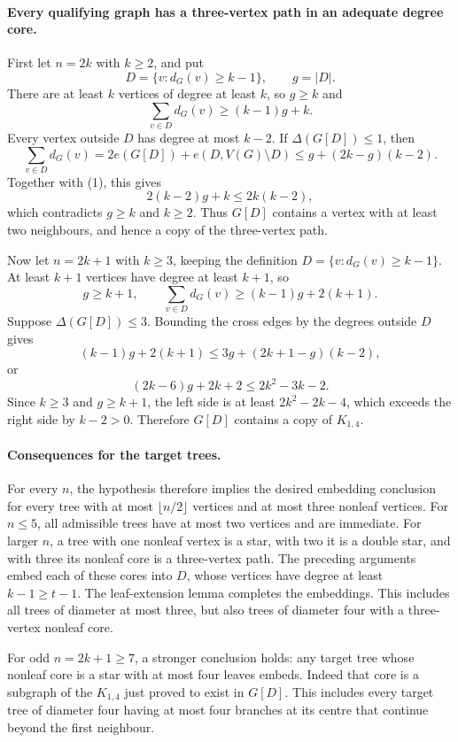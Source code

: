 \paragraph{Every qualifying graph has a three-vertex path in an adequate degree core.}
First let $n=2k$ with $k\ge2$, and put
\[
D=\{v:d_G(v)\ge k-1\},\qquad g=|D|.
\]
There are at least $k$ vertices of degree at least $k$, so $g\ge k$ and
\[
\sum_{v\in D}d_G(v)\ge(k-1)g+k.
\tag{1}
\]
Every vertex outside $D$ has degree at most $k-2$. If $\Delta(G[D])\le1$, then
\[
\sum_{v\in D}d_G(v)
=2e(G[D])+e(D,V(G)\setminus D)
\le g+(2k-g)(k-2).
\]
Together with (1), this gives
\[
2(k-2)g+k\le2k(k-2),
\]
which contradicts $g\ge k$ and $k\ge2$. Thus $G[D]$ contains a vertex with at least two neighbours, and hence a copy of the three-vertex path.

Now let $n=2k+1$ with $k\ge3$, keeping the definition $D=\{v:d_G(v)\ge k-1\}$. At least $k+1$ vertices have degree at least $k+1$, so
\[
g\ge k+1,\qquad
\sum_{v\in D}d_G(v)\ge(k-1)g+2(k+1).
\tag{2}
\]
Suppose $\Delta(G[D])\le3$. Bounding the cross edges by the degrees outside $D$ gives
\[
(k-1)g+2(k+1)\le3g+(2k+1-g)(k-2),
\]
or
\[
(2k-6)g+2k+2\le2k^2-3k-2.
\]
Since $k\ge3$ and $g\ge k+1$, the left side is at least $2k^2-2k-4$, which exceeds the right side by $k-2>0$. Therefore $G[D]$ contains a copy of $K_{1,4}$.

\paragraph{Consequences for the target trees.}
For every $n$, the hypothesis therefore implies the desired embedding conclusion for every tree with at most $\lfloor n/2\rfloor$ vertices and at most three nonleaf vertices. For $n\le5$, all admissible trees have at most two vertices and are immediate. For larger $n$, a tree with one nonleaf vertex is a star, with two it is a double star, and with three its nonleaf core is a three-vertex path. The preceding arguments embed each of these cores into $D$, whose vertices have degree at least $k-1\ge t-1$. The leaf-extension lemma completes the embeddings. This includes all trees of diameter at most three, but also trees of diameter four with a three-vertex nonleaf core.

For odd $n=2k+1\ge7$, a stronger conclusion holds: any target tree whose nonleaf core is a star with at most four leaves embeds. Indeed that core is a subgraph of the $K_{1,4}$ just proved to exist in $G[D]$. This includes every target tree of diameter four having at most four branches at its centre that continue beyond the first neighbour.

